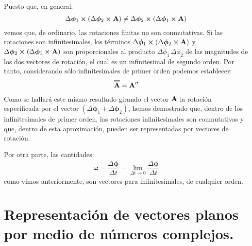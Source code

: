 Puesto que, en general:
\begin{align*}
    \Delta \bm{\phi}_{1} \cp \left( \Delta \bm{\phi}_{2} \cp \vb{A} \right) \neq \Delta \bm{\phi}_{2} \cp \left( \Delta \bm{\phi}_{1} \cp \vb{A} \right)
\end{align*}
vemos que, de ordinario, las rotaciones finitas no son conmutativas. Si las rotaciones son infinitesimales, los términos $\Delta \bm{\phi}_{1} \cp \left( \Delta \bm{\phi}_{2} \cp \vb{A} \right)$ y $\Delta \bm{\phi}_{2} \cp \left( \Delta \bm{\phi}_{1} \cp \vb{A} \right)$ son proporcionales al producto $\Delta \phi_{1} \, \Delta \phi_{2}$ de las magnitudes de los dos vectores de rotación, el cual es un infinitesimal de 
segundo orden. Por tanto, considerando sólo infinitesimales de primer orden podemos establecer:
\begin{align*}
    \overline{\overline{\vb{A}}} = \vb{A}^{\prime \prime} 
\end{align*}
Como se hallará este mismo resultado girando el vector $\vb{A}$ la rotación especificada por el vector $\left( \Delta \bm{\phi}_{1} + \Delta \bm{\phi}_{2} \right)$, hemos demostrado que, dentro de los infinitesimales de primer orden, las rotaciones infinitesimales son conmutativas y que, dentro de esta aproximación, pueden ser representadas por vectores de rotación. 
\par
Por otra parte, las cantidades:
\begin{align}
    \bm{\omega} = \dfrac{\Delta \bm{\phi}}{\Delta t} = \lim_{\Delta t \to 0} \dfrac{\Delta \bm{\phi}}{\Delta t}
    \label{eq:ecuacion_01_77}
\end{align}
como vimos anteriormente, son vectores para infinitesimales, de cualquier orden.

\section{Representación de vectores planos por medio de números complejos.}

